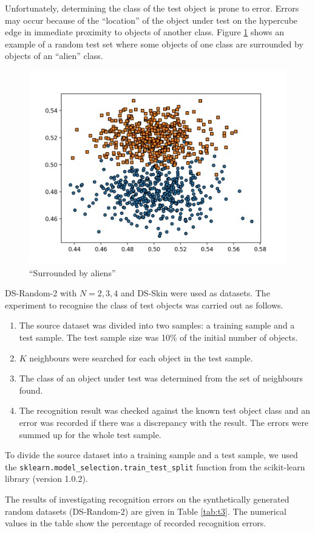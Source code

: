 \documentclass[entropy,article,submit,moreauthors,pdftex]{Definitions/mdpi}
\begin{document}
\begin{paracol}{2}
Unfortunately, determining the class of the test object is prone to error. Errors may occur because of the ``location'' of the object under test on the hypercube edge in immediate proximity to objects of another class. Figure \ref{fig7} shows an example of a random test set where some objects of one class are surrounded by objects of an ``alien'' class.

\begin{figure}[h]
\widefigure
\includegraphics[width=0.7\linewidth]{fig7.png}
\caption{``Surrounded by aliens''\label{fig7}}
\end{figure}

DS-Random-2 with $N = 2, 3, 4$ and DS-Skin were used as datasets. The experiment to recognise the class of test objects was carried out as follows.

\begin{enumerate}
\item The source dataset was divided into two samples: a training sample and a test sample. The test sample size was 10\% of the initial number of objects.
\item $K$ neighbours were searched for each object in the test sample.
\item The class of an object under test was determined from the set of neighbours found.
\item The recognition result was checked against the known test object class and an error was recorded if there was a discrepancy with the result. The errors were summed up for the whole test sample.
\end{enumerate}

To divide the source dataset into a training sample and a test sample, we used the \texttt{sklearn.model\_selection.train\_test\_split} function from the scikit-learn library (version 1.0.2).

The results of investigating recognition errors on the synthetically generated random datasets (DS-Random-2) are given in Table \ref{tab:t3}. The numerical values in the table show the percentage of recorded recognition errors.


\end{paracol}
\end{document}
